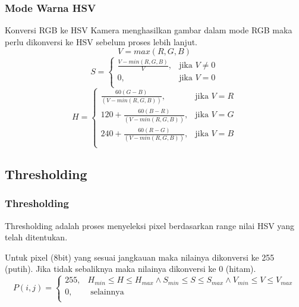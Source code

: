 \documentclass[table,dvipsnames]{beamer}
\begin{document}
\begin{frame}
\frametitle{Mode Warna HSV}
\begin{block}{Konversi RGB ke HSV}
Kamera menghasilkan gambar dalam mode RGB maka perlu dikonversi ke HSV sebelum proses lebih lanjut.
\begin{equation}
  V = max(R,G,B)
\end{equation}
\begin{equation}
  S =  
  \begin{cases}
      \frac{V-min(R,G,B)}{V},& \text{jika } V\neq 0\\
      0,              & \text{jika } V = 0\\
  \end{cases}
\end{equation}
\begin{equation}
  H =  
  \begin{cases}
      \frac{60(G-B)}{(V-min(R,G,B))},& \text{jika } V = R\\
      120 + \frac{60(B-R)}{(V-min(R,G,B))},& \text{jika } V = G\\
      240 + \frac{60(R-G)}{(V-min(R,G,B))},& \text{jika } V = B\\
  \end{cases}
\end{equation}
\end{block}
\end{frame}

\subsection{Thresholding}

\begin{frame}
\frametitle{Thresholding}
\begin{block}{}
Thresholding adalah proses menyeleksi pixel berdasarkan range nilai HSV yang telah ditentukan.
\end{block}
\begin{block}{}
Untuk pixel (8bit) yang sesuai jangkauan maka nilainya dikonversi ke 255 (putih).
Jika tidak sebaliknya maka nilainya dikonversi ke 0 (hitam).
\begin{equation}
  P(i,j) =  
  \begin{cases}
      255,& H_{min} \leq H\leq H_{max} \land S_{min} \leq S\leq S_{max} \land V_{min} \leq V\leq V_{max}\\
      0,              & \text{ selainnya } \\
  \end{cases}
\end{equation}
\end{block}
\end{frame}
\end{document}
